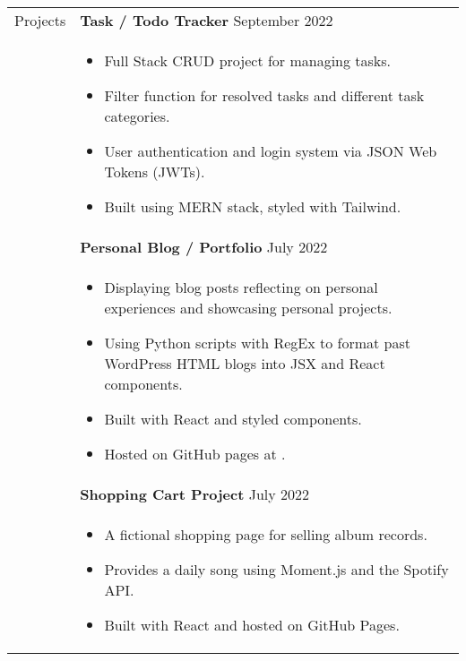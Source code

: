 \documentclass[11pt]{article}
\begin{document}
\begin{minipage}[t][0pt]{\linewidth} %
    \begin{tabular}[t]{p{2cm} p{14cm}}
    	{Projects} &

		\textbf{Task / Todo Tracker}  \hfill September 2022 \\ &
		\begin{itemize}
			\renewcommand{\labelitemi}{$\diamond$}
			\item Full Stack CRUD project for managing tasks.
			\item Filter function for resolved tasks and different task categories.
			\item User authentication and login system via JSON Web Tokens (JWTs).
			\item Built using MERN stack, styled with Tailwind.
		\end{itemize} \\ &

		\textbf{Personal Blog / Portfolio}  \hfill July 2022 \\ &
		\begin{itemize}
			\renewcommand{\labelitemi}{$\diamond$}
			\item Displaying blog posts reflecting on personal experiences and showcasing personal projects.
			\item Using Python scripts with RegEx to format past WordPress HTML blogs into JSX and React components.
			\item Built with React and styled components. 
			\item Hosted on GitHub pages at \href{https://jluong23.github.io/blog}{\color{Blue}{jluong23.github.io/blog}}.
		\end{itemize} \\ &

		\textbf{Shopping Cart Project}  \hfill July 2022 \\ &
		\begin{itemize}
			\renewcommand{\labelitemi}{$\diamond$}
			\item A fictional shopping page for selling album records. 
			\item Provides a daily song using Moment.js and the Spotify API.
			\item Built with React and hosted on GitHub Pages.
		\end{itemize} \\


\end{tabular}
\end{minipage}
\end{document}
